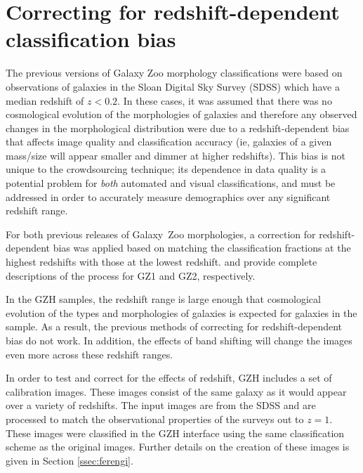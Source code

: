 \documentclass[twocolumn]{aastex6}
\begin{document}
\section{Correcting for redshift-dependent classification bias}\label{sec:debiasing}

The previous versions of Galaxy Zoo morphology classifications
\citep{lin11,wil13} were based on observations of galaxies in the Sloan Digital
Sky Survey (SDSS) which have a median redshift of $z<0.2$. In these cases, it
was assumed that there was no cosmological evolution of the morphologies of
galaxies and therefore any observed changes in the morphological distribution
were due to a redshift-dependent bias that affects image quality and
classification accuracy (ie, galaxies of a given mass/size will appear smaller
and dimmer at higher redshifts).  This bias is not unique to the crowdsourcing
technique; its dependence in data quality is a potential problem for
\emph{both} automated and visual classifications, and must be addressed in
order to accurately measure demographics over any significant redshift range. 

For both previous releases of Galaxy~Zoo morphologies, a correction for
redshift-dependent bias was applied based on matching the classification
fractions at the highest redshifts with those at the lowest redshift.
\citet{bam09} and \citet{wil13} provide complete descriptions of the process
for GZ1 and GZ2, respectively.

In the GZH samples, the redshift range is large enough that cosmological
evolution of the types and morphologies of galaxies is expected for galaxies in
the sample. As a result, the previous methods of correcting for
redshift-dependent bias do not work. In addition, the effects of band shifting
will change the images even more across these redshift ranges. 

In order to test and correct for the effects of redshift, GZH includes a set of
calibration images. These images consist of the same galaxy as it would appear
over a variety of redshifts. The input images are from the SDSS
\citep{yor00,str02} and are processed to match the observational properties of
the \hst{} surveys out to $z=1$. These images were classified in the GZH
interface using the same classification scheme as the original \hst{} images.
Further details on the creation of these images is given in Section
\ref{ssec:ferengi}.
\end{document}

